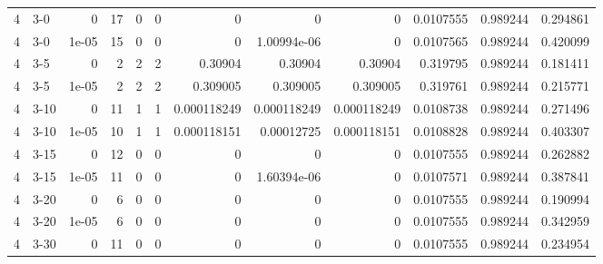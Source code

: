 \begin{tabular}{rlrrrrrrrrrr}
     4 & 3-0    &      0     &          17 &                 0 &                 0 &     0           &     0           &      0           &        0.0107555 &               0.989244 &           0.294861 \\
     4 & 3-0    &      1e-05 &          15 &                 0 &                 0 &     0           &     1.00994e-06 &      0           &        0.0107565 &               0.989244 &           0.420099 \\
     4 & 3-5    &      0     &           2 &                 2 &                 2 &     0.30904     &     0.30904     &      0.30904     &        0.319795  &               0.989244 &           0.181411 \\
     4 & 3-5    &      1e-05 &           2 &                 2 &                 2 &     0.309005    &     0.309005    &      0.309005    &        0.319761  &               0.989244 &           0.215771 \\
     4 & 3-10   &      0     &          11 &                 1 &                 1 &     0.000118249 &     0.000118249 &      0.000118249 &        0.0108738 &               0.989244 &           0.271496 \\
     4 & 3-10   &      1e-05 &          10 &                 1 &                 1 &     0.000118151 &     0.00012725  &      0.000118151 &        0.0108828 &               0.989244 &           0.403307 \\
     4 & 3-15   &      0     &          12 &                 0 &                 0 &     0           &     0           &      0           &        0.0107555 &               0.989244 &           0.262882 \\
     4 & 3-15   &      1e-05 &          11 &                 0 &                 0 &     0           &     1.60394e-06 &      0           &        0.0107571 &               0.989244 &           0.387841 \\
     4 & 3-20   &      0     &           6 &                 0 &                 0 &     0           &     0           &      0           &        0.0107555 &               0.989244 &           0.190994 \\
     4 & 3-20   &      1e-05 &           6 &                 0 &                 0 &     0           &     0           &      0           &        0.0107555 &               0.989244 &           0.342959 \\
     4 & 3-30   &      0     &          11 &                 0 &                 0 &     0           &     0           &      0           &        0.0107555 &               0.989244 &           0.234954 \\

\end{tabular}
